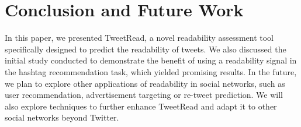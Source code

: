 \documentclass{sig-alternate-05-2015}
\begin{document}
\section{Conclusion and Future Work}
In this paper, we presented TweetRead, a novel readability assessment tool specifically designed to predict the readability of tweets. We also discussed the initial study conducted to demonstrate the benefit of using a readability signal in the hashtag recommendation task, which yielded promising results.
In the future, we plan to explore other applications of readability in social networks, such as user recommendation, advertisement targeting or re-tweet prediction. We will also explore techniques to further enhance TweetRead and adapt it to other social networks beyond Twitter.

%

%
%
\end{document}
